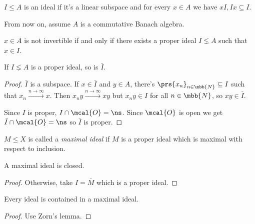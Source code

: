 \documentclass[10pt, twoside]{book}
\begin{document}
\begin{definition}[Ideal]
$I \leq A$ is an ideal if it's a linear subspace and for every $x \in A$ we have $xI,Ix \subseteq I$.
\end{definition}

From now on, assume $A$ is a commutative Banach algebra.

\begin{fact}
$x \in A$ is not invertible if and only if there exists a proper ideal $I \lneq A$ such that $x \in I$.
\end{fact}

\begin{proposition}
If $I \lneq A$ is a proper ideal, so is $\bar{I}$.
\end{proposition}

\begin{proof}
$\bar{I}$ is a subspace. If $x \in \bar{I}$ and $y \in A$, there's $\prs{x_n}_{n \in \mbb{N}} \subseteq I$ such that $x_n \xrightarrow{n\to\infty} x$. Then $x_n y \xrightarrow{n\to\infty} xy$ but $x_n y \in I$ for all $n \in \mbb{N}$, so $xy \in \bar{I}$.

Since $I$ is proper, $I \cap \mcal{O} = \ns$. Since $\mcal{O}$ is open we get $\bar{I} \cap \mcal{O} = \ns$ so $\bar{I}$ is proper.
\end{proof}

\begin{definition}
$M \leq X$ is called a \emph{maximal ideal} if $M$ is a proper ideal which is maximal with respect to inclusion.
\end{definition}

\begin{proposition}
A maximal ideal is closed.
\end{proposition}

\begin{proof}
Otherwise, take $I = \bar{M}$ which is a proper ideal.
\end{proof}

\begin{fact}
Every ideal is contained in a maximal ideal.
\end{fact}

\begin{proof}
Use Zorn's lemma.
\end{proof}
\end{document}
